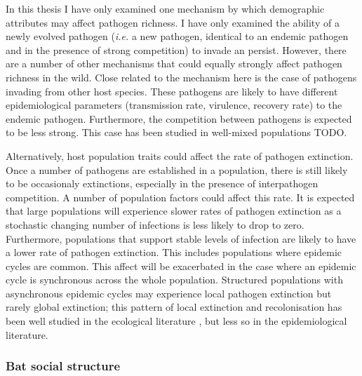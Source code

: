 In this thesis I have only examined one mechanism by which demographic attributes may affect pathogen richness.
I have only examined the ability of a newly evolved pathogen (\emph{i.e.} a new pathogen, identical to an endemic pathogen and in the presence of strong competition) to invade an persist.
However, there are a number of other mechanisms that could equally strongly affect pathogen richness in the wild.
Close related to the mechanism here is the case of pathogens invading from other host species.
These pathogens are likely to have different epidemiological parameters (transmission rate, virulence, recovery rate) to the endemic pathogen.
Furthermore, the competition between pathogens is expected to be less strong.
This case has been studied in well-mixed populations TODO.

Alternatively, host population traits could affect the rate of pathogen extinction.
Once a number of pathogens are established in a population, there is still likely to be occasionaly extinctions, especially in the presence of interpathogen competition.
A number of population factors could affect this rate.
It is expected that large populations will experience slower rates of pathogen extinction as a stochastic changing number of infections is less likely to drop to zero.
Furthermore, populations that support stable levels of infection are likely to have a lower rate of pathogen extinction.
This includes populations where epidemic cycles are common.
This affect will be exacerbated in the case where an epidemic cycle is synchronous across the whole population.
Structured populations with asynchronous epidemic cycles may experience local pathogen extinction but rarely global extinction; this pattern of local extinction and recolonisation has been well studied in the ecological literature \cite{grenfell1995seasonality, levin1974dispersion, hanski1998metapopulation}, but less so in the epidemiological literature. %


\subsubsection{Bat social structure}

